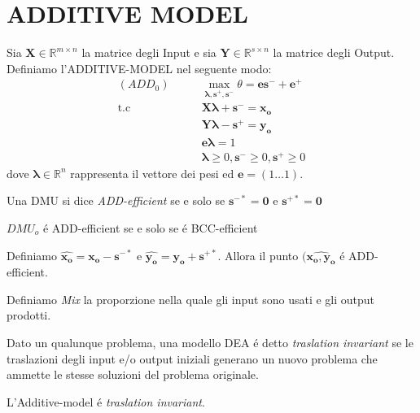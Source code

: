 \section{ADDITIVE MODEL}
\bigskip
\begin{definiz}
Sia $\boldsymbol{X} \in \mathbb{R}^{m \times n}$ la matrice degli Input e sia $\boldsymbol{Y} \in \mathbb{R}^{s \times n}$  la matrice degli Output. Definiamo l'ADDITIVE-MODEL nel seguente modo:
\begin{equation}
\begin{split}
(ADD_0) \qquad & \max_{\boldsymbol{\lambda, s^+, s^-}} \theta = \boldsymbol{es^- + e^+}\\
\text{t.c} \qquad & \boldsymbol{X\lambda + s^-} =  \boldsymbol{x_o} \\
& \boldsymbol{Y\lambda - s^+} = \boldsymbol{y_o} \\
& \boldsymbol{e\lambda} = 1 \\
& \boldsymbol{\lambda} \geq 0 , \boldsymbol{s^-} \geq 0 ,\boldsymbol{s^+} \geq 0 
\end{split}
\end{equation}
dove $\boldsymbol{\lambda} \in \mathbb{R}^{n}$ rappresenta il vettore dei pesi ed $\boldsymbol{e} = (1 \dots 1)$.
\end{definiz}
\begin{definiz}
Una DMU si dice \emph{ADD-efficient} se e solo se $\boldsymbol{s^{-*} = 0}$ e $\boldsymbol{s^{+*} = 0}$
\end{definiz}
\begin{teor} $DMU_{o}$ \'e ADD-efficient se e solo se \'e BCC-efficient
\end{teor}
\begin{teor} Definiamo $\hat{\boldsymbol{x_{o}}} = \boldsymbol{x_{o} - s^{-*}}$ e $\hat{\boldsymbol{y_{o}}} = \boldsymbol{y_{o} + s^{+*}}$. Allora il punto $(\hat{\boldsymbol{x_{o}}, \boldsymbol{y_{o}}}$ \'e ADD-efficient.
\end{teor}
\begin{definiz} Definiamo \emph{Mix} la proporzione nella quale gli input sono usati e gli output prodotti.
\end{definiz}
\begin{definiz} Dato un qualunque problema, una modello DEA \'e detto \emph{traslation invariant} se le traslazioni degli input e/o output iniziali generano un nuovo problema che ammette le stesse soluzioni del problema originale.
\end{definiz}
\begin{teor} L'Additive-model \'e \emph{traslation invariant}.
\end{teor}

